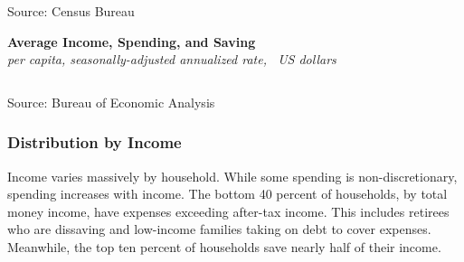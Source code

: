\documentclass{report}
\makeatletter
\newcommand{\tbllink}[1]{\href{https://raw.githubusercontent.com/bdecon/US-chartbook/master/chartbook/data/#1}{\faTable}}
\newcommand*\short[1]{\expandafter\@gobbletwo\number\numexpr#1\relax}
\newcommand{\absnode}[3]{\node[below right, align=left] at (axis cs: #1,#2) {#3};}
\newcommand{\shdateaxisticks}{
		date coordinates in=x, axis line style={draw=none},
		xmax={2024-01-31},
		max space between ticks=40,	    
		xtick={{1990-01-01}, {1995-01-01}, {2000-01-01}, 
			{2005-01-01}, {2010-01-01}, {2015-01-01}, {2020-01-01}},
		minor xtick={},
		enlarge y limits={0.06}, enlarge x limits={0.01},
		xticklabel style={align=center, yshift=-2pt}, tick label style={inner sep=0pt},
		}
\newcommand{\bbar}[2]{extra #1 ticks = {{#2}}, extra #1 tick labels = ,
		extra #1 tick style = {grid=major, grid style={thick, black!25}},}
\newcommand{\thickline}[4]{\addplot[ultra thick, no markers, color=#1] 
		table [x=#2, y=#3, col sep=comma] {#4};	}
\newcommand{\rbars}{
		\fill[color=black!10] (axis cs:{1990-07-01},\pgfkeysvalueof{/pgfplots/ymin})
			rectangle (axis cs:{1991-03-01}, \pgfkeysvalueof{/pgfplots/ymax});
		\fill[color=black!10] (axis cs:{2007-12-01},\pgfkeysvalueof{/pgfplots/ymin})
			rectangle (axis cs:{2009-07-01}, \pgfkeysvalueof{/pgfplots/ymax});
		\fill[color=black!10] (axis cs:{2001-03-01},\pgfkeysvalueof{/pgfplots/ymin})
			rectangle (axis cs:{2001-11-01}, \pgfkeysvalueof{/pgfplots/ymax});
		\fill[color=black!10] (axis cs:{2020-02-01},\pgfkeysvalueof{/pgfplots/ymin})
			rectangle (axis cs:{2020-05-01}, \pgfkeysvalueof{/pgfplots/ymax});}
\makeatother
\begin{document}
{\begin{minipage}{0.43\textwidth}
\hspace{2mm} 

\footnotesize{Source: Census Bureau} \hfill \tbllink{medincexp.csv}
\end{minipage}
\vspace{4mm}

\begin{minipage}{1.0\textwidth}
\normalsize \textbf{Average Income, Spending, and Saving}\\
\footnotesize{\textit{per capita, seasonally-adjusted annualized rate, \unskip \ US dollars}}\\
\hspace*{-2mm}  \setlength{\tabcolsep}{2.6pt} \color{black!90}
		{\renewcommand{\arraystretch}{1.55}
		 \begin{tabular}{p{33mm} R{13mm} R{12mm} R{12mm} R{12mm} R{12mm} R{12mm}}
			  \hline
		\end{tabular}}
		\vspace{-2.8mm}
		
\footnotesize{Source: Bureau of Economic Analysis}
\end{minipage}
\newpage
\vspace*{-9mm}

\begin{minipage}{1.0\textwidth}  
\subsubsection*{Distribution by Income} 
\small Income varies massively by household. While some spending is non-discretionary, spending increases with income. The bottom 40 percent of households, by total money income, have expenses exceeding after-tax income. This includes retirees who are dissaving and low-income families taking on debt to cover expenses. Meanwhile, the top ten percent of households save nearly half of their income.


\end{minipage}}
\end{document}
